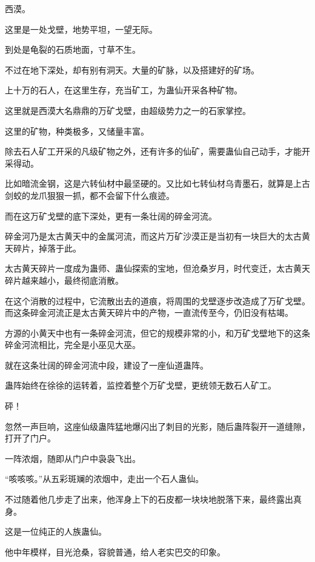 
\begin{this_body}

西漠。

这里是一处戈壁，地势平坦，一望无际。

到处是龟裂的石质地面，寸草不生。

不过在地下深处，却有别有洞天。大量的矿脉，以及搭建好的矿场。

上十万的石人，在这里生存，充当矿工，为蛊仙开采各种矿物。

这里就是西漠大名鼎鼎的万矿戈壁，由超级势力之一的石家掌控。

这里的矿物，种类极多，又储量丰富。

除去石人矿工开采的凡级矿物之外，还有许多的仙矿，需要蛊仙自己动手，才能开采得动。

比如暗流金钢，这是六转仙材中最坚硬的。又比如七转仙材乌青墨石，就算是上古剑蛟的龙爪狠狠一抓，都不会留下什么痕迹。

而在这万矿戈壁的底下深处，更有一条壮阔的碎金河流。

碎金河乃是太古黄天中的金属河流，而这片万矿沙漠正是当初有一块巨大的太古黄天碎片，掉落于此。

太古黄天碎片一度成为蛊师、蛊仙探索的宝地，但沧桑岁月，时代变迁，太古黄天碎片越来越小，最终彻底消散。

在这个消散的过程中，它流散出去的道痕，将周围的戈壁逐步改造成了万矿戈壁。而这条碎金河流正是太古黄天碎片中的产物，一直流传至今，仍旧没有枯竭。

方源的小黄天中也有一条碎金河流，但它的规模非常的小，和万矿戈壁地下的这条碎金河流相比，完全是小巫见大巫。

就在这条壮阔的碎金河流中段，建设了一座仙道蛊阵。

蛊阵始终在徐徐的运转着，监控着整个万矿戈壁，更统领无数石人矿工。

砰！

忽然一声巨响，这座仙级蛊阵猛地爆闪出了刺目的光影，随后蛊阵裂开一道缝隙，打开了门户。

一阵浓烟，随即从门户中袅袅飞出。

“咳咳咳。”从五彩斑斓的浓烟中，走出一个石人蛊仙。

不过随着他几步走了出来，他浑身上下的石皮都一块块地脱落下来，最终露出真身。

这是一位纯正的人族蛊仙。

他中年模样，目光沧桑，容貌普通，给人老实巴交的印象。


\end{this_body}
